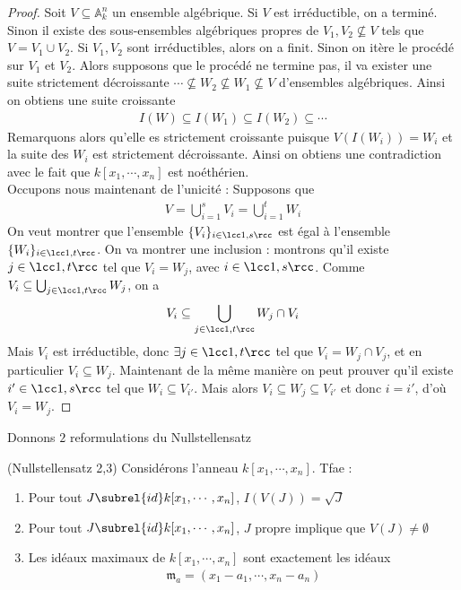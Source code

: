         \begin{proof}
            Soit $V \subseteq \mathbb{A}_k^n$ un ensemble algébrique. Si $V$ est irréductible, on a terminé. Sinon il existe des sous-ensembles algébriques propres de $V_1, V_2 \nsubseteq V$ tels que $V = V_1 \cup V_2$. Si $V_1,V_2$ sont irréductibles, alors on a finit. Sinon on itère le procédé sur $V_1$ et $V_2$. Alors supposons que le procédé ne termine pas, il va exister une suite strictement décroissante $\cdots \nsubseteq W_2 \nsubseteq W_1 \nsubseteq V$ d'ensembles algébriques. Ainsi on obtiens une suite croissante
            \begin{align*}
                I(W) \subseteq I(W_1) \subseteq I(W_2) \subseteq \cdots
            \end{align*}
            Remarquons alors qu'elle es strictement croissante puisque $V(I(W_i)) = W_i$ et la suite des $W_i$ est strictement décroissante. Ainsi on obtiens une contradiction avec le fait que $k[x_1, \cdots, x_n]$ est noéthérien. \\
            Occupons nous maintenant de l'unicité : Supposons que 
            \begin{align*}
                V = \bigcup_{i = 1}^s V_i = \bigcup_{i = 1}^t W_i
            \end{align*}
            On veut montrer que l'ensemble $\{V_i\}_{i \in \lcc 1,s \rcc}$ est égal à l'ensemble $\{W_i\}_{i \in \lcc 1,t \rcc}$. On va montrer une inclusion : montrons qu'il existe $j \in \lcc 1,t \rcc$ tel que $V_i = W_j$, avec $i \in \lcc 1,s \rcc$. Comme $V_i \subseteq \bigcup_{j \in \lcc 1,t \rcc} W_j$, on a
            \begin{align*}
                V_i \subseteq \bigcup_{j \in \lcc 1,t \rcc} W_j \cap V_i
            \end{align*}
            Mais $V_i$ est irréductible, donc $\exists j \in \lcc 1,t \rcc$ tel que $V_i = W_j \cap V_j$, et en particulier $V_i \subseteq W_j$. Maintenant de la même manière on peut prouver qu'il existe $i' \in \lcc 1,s \rcc$ tel que $W_i \subseteq V_{i'}$. Mais alors $V_i \subseteq W_j \subseteq V_{i'}$ et donc $i = i'$, d'où $V_i = W_j$.
        \end{proof}
        Donnons $2$ reformulations du Nullstellensatz
        \begin{prop} (Nullstellensatz 2,3)
            Considérons l'anneau $k[x_1, \cdots, x_n]$. Tfae :
            \begin{enumerate}
                \item \label{null_1} Pour tout $J \subrel{id} k[x_1, \cdots, x_n]$, $I(V(J)) = \sqrt{J}$
                \item \label{null_2} Pour tout $J \subrel{id} k[x_1, \cdots, x_n]$, $J$ propre implique que $V(J) \neq \emptyset$
                \item \label{null_3} Les idéaux maximaux de $k[x_1, \cdots, x_n]$ sont exactement les idéaux
                \begin{align*}
                    \mathfrak{m}_a = (x_1 - a_1, \cdots, x_n - a_n)
                \end{align*}
            \end{enumerate}
        \end{prop}
